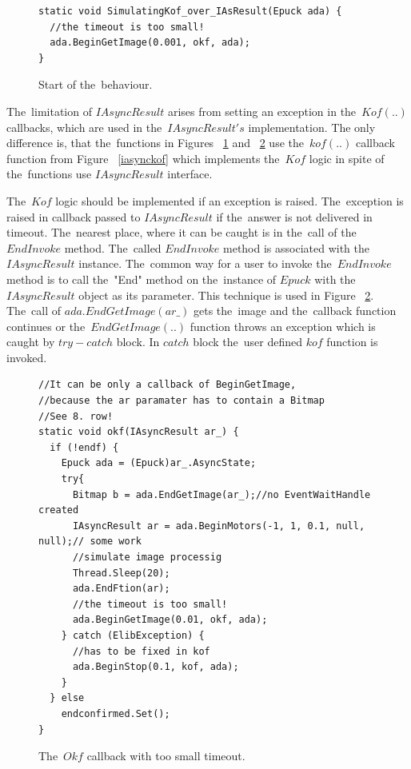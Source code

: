 \begin{figure}[!hbp]
\begin{lstlisting}
static void SimulatingKof_over_IAsResult(Epuck ada) {
  //the timeout is too small!
  ada.BeginGetImage(0.001, okf, ada);
}
\end{lstlisting}
\caption{Start of the~behaviour.}
\label{c:start}
\end{figure}

  The~limitation of $IAsyncResult$ arises from setting an exception in the~$Kof(..)$ callbacks,
  which are used in the~$IAsyncResult's$ implementation.
  The only difference is, that the~functions in Figures ~\ref{c:start} 
  and ~\ref{c:okfsim} use the~$kof(..)$ callback function
  from Figure ~\ref{iasynckof} 
  which implements the~$Kof$ logic in spite of the~functions use $IAsyncResult$ interface.

  The~$Kof$ logic should be implemented if an exception is raised. 
  The~exception is raised in callback passed to $IAsyncResult$ if the~answer is not delivered in timeout. 
  The~nearest place, where it can be caught is in the~call of the~$EndInvoke$ method.
  The~called $EndInvoke$ method is associated with the~$IAsyncResult$ instance. 
  The~common way for a user to invoke the~$EndInvoke$ method is to call the~"End" method 
  on the~instance of $Epuck$ with the~$IAsyncResult$ object as its parameter. 
  This technique is used in Figure ~\ref{c:okfsim}.
  The~call of $ada.EndGetImage(ar\_)$ gets the~image and the~callback function continues
  or the~$EndGetImage(..)$ function throws an exception which is caught by $try-catch$ block.
  In $catch$ block the~user defined $kof$ function is invoked.
  
\begin{figure}[!hbp]
\begin{lstlisting}
//It can be only a callback of BeginGetImage,
//because the ar paramater has to contain a Bitmap
//See 8. row!
static void okf(IAsyncResult ar_) {
  if (!endf) {
    Epuck ada = (Epuck)ar_.AsyncState;
    try{
      Bitmap b = ada.EndGetImage(ar_);//no EventWaitHandle created
      IAsyncResult ar = ada.BeginMotors(-1, 1, 0.1, null, null);// some work
      //simulate image processig
      Thread.Sleep(20);
      ada.EndFtion(ar);
      //the timeout is too small!
      ada.BeginGetImage(0.01, okf, ada);
    } catch (ElibException) {
      //has to be fixed in kof
      ada.BeginStop(0.1, kof, ada);
    }
  } else
    endconfirmed.Set();
}
\end{lstlisting}
\caption{The~$Okf$ callback with too small timeout.}
\label{c:okfsim}
\end{figure}

